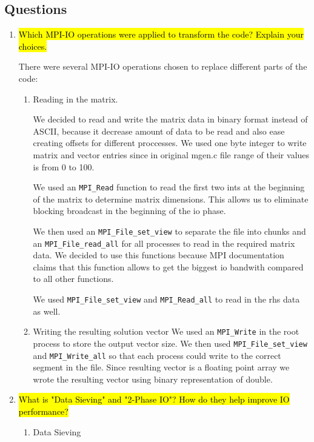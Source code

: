 \subsection{Questions}
\begin{enumerate}
  \item \hl{Which MPI-IO operations were applied to transform the code? Explain your choices.}

  There were several MPI-IO operations chosen to replace different parts of the code:
  \begin{enumerate}
  \item Reading in the matrix.
  
  We decided to read and write the matrix data in binary format instead of ASCII, because it decrease amount of data to be read
  and also ease creating offsets for different proccesses. We used one byte integer to write matrix and vector entries
  since in original mgen.c file range of their values is from 0 to 100.

  We used an \verb!MPI_Read! function to read the first two ints at the beginning of the matrix to determine matrix dimensions.
  This allows us to eliminate blocking broadcast in the beginning of the io phase.

  We then used an \verb!MPI_File_set_view! to separate the file into chunks and an \verb!MPI_File_read_all! for all 
  processes to read in the required matrix data. We decided to use this functions because MPI documentation claims
  that this function allows to get the biggest io bandwith compared to all other functions.
  
  We used \verb!MPI_File_set_view! and \verb!MPI_Read_all! to read in the rhs data as well.
  
  \item Writing the resulting solution vector
  We used an \verb!MPI_Write! in the root process to store the output vector size. We then used \verb!MPI_File_set_view!
  and \verb!MPI_Write_all! so that each process could write to the correct segment in the file. Since resulting vector 
  is a floating point array we wrote the resulting vector using binary representation of double.
  
  \end{enumerate}
  
  \enlargethispage{-2\baselineskip} %

  \item \hl{What is "Data Sieving" and "2-Phase IO"? How do they help improve IO
performance?}
	\begin{enumerate}
	\item Data Sieving
	

\end{enumerate}
\end{enumerate}
